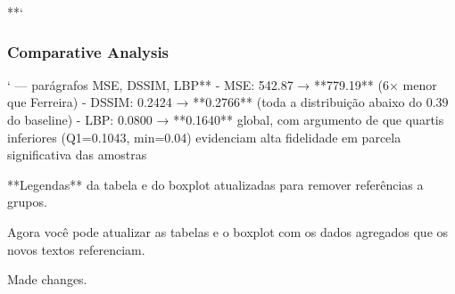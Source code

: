 **`\subsubsection{Comparative Analysis}` — parágrafos MSE, DSSIM, LBP**
- MSE: 542.87 → **779.19** (6× menor que Ferreira)
- DSSIM: 0.2424 → **0.2766** (toda a distribuição abaixo do 0.39 do baseline)
- LBP: 0.0800 → **0.1640** global, com argumento de que quartis inferiores (Q1=0.1043, min=0.04) evidenciam alta fidelidade em parcela significativa das amostras

**Legendas** da tabela e do boxplot atualizadas para remover referências a grupos.

Agora você pode atualizar as tabelas e o boxplot com os dados agregados que os novos textos referenciam.

Made changes.